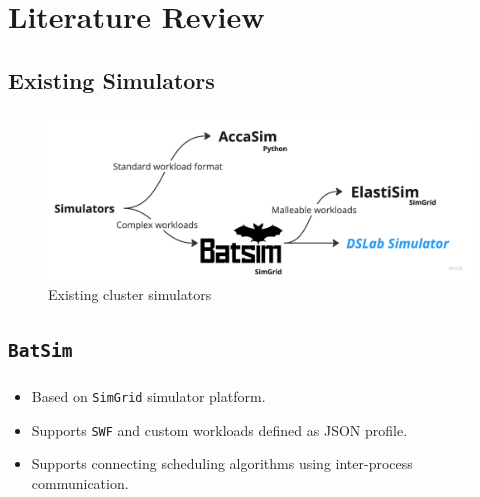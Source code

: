 \documentclass[t]{beamer}  %
\begin{document}
	\section{Literature Review}
	\subsection{Existing Simulators}
	\begin{frame}
		\frametitle{\insertsection} 
		\framesubtitle{\insertsubsection}

		\begin{figure}[H]
			\hspace{-1cm}
			\includegraphics[width=1.1\linewidth]{images/simulators}
			\vspace{0.2cm}
			\caption*{Existing cluster simulators}
		\end{figure}
	\end{frame}

	\subsection{\texttt{BatSim}}

	\begin{frame}[fragile]
		\frametitle{\insertsection} 
		\framesubtitle{\insertsubsection}
		\vspace{1cm}	
		\begin{itemize}
			\item Based on \texttt{SimGrid} simulator platform.
			\item Supports \texttt{SWF} and custom workloads defined as JSON profile.
			\item Supports connecting scheduling algorithms using inter-process communication.
		\end{itemize}
		\end{frame}
\end{document}
